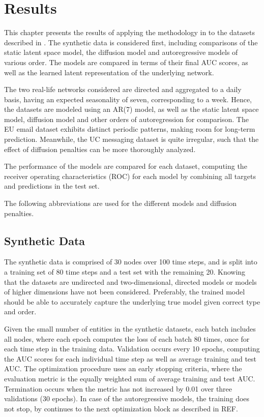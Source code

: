 \chapter{Results}\label{ch:Results}

This chapter presents the results of applying the methodology in  to the datasets described in . The synthetic data is considered first, including comparisons of the static latent space model, the diffusion model and autoregressive models of various order. The models are compared in terms of their final AUC scores, as well as the learned latent representation of the underlying network. 

The two real-life networks considered are directed and aggregated to a daily basis, having an expected seasonality of seven, corresponding to a week. Hence, the datasets are modeled using an AR(7) model, as well as the static latent space model, diffusion model and other orders of autoregression for comparison. The EU email dataset exhibits distinct periodic patterns, making room for long-term prediction. Meanwhile, the UC messaging dataset is quite irregular, such that the effect of diffusion penalties can be more thoroughly analyzed.

The performance of the models are compared for each dataset, computing the receiver operating characteristics (ROC) for each model by combining all targets and predictions in the test set. 

The following abbreviations are used for the different models and diffusion penalties.




\section{Synthetic Data}

The synthetic data is comprised of 30 nodes over 100 time steps, and is split into a training set of 80 time steps and a test set with the remaining 20. Knowing that the datasets are undirected and two-dimensional, directed models or models of higher dimensions have not been considered. Preferably, the trained model should be able to accurately capture the underlying true model given correct type and order.

Given the small number of entities in the synthetic datasets, each batch includes all nodes, where each epoch computes the loss of each batch 80 times, once for each time step in the training data. Validation occurs every 10 epochs, computing the AUC scores for each individual time step as well as average training and test AUC.
The optimization procedure uses an early stopping criteria, where the evaluation metric is the equally weighted sum of average training and test AUC. Termination occurs when the metric has not increased by 0.01 over three validations (30 epochs). In case of the autoregressive models, the training does not stop, by continues to the next optimization block as described in REF.

